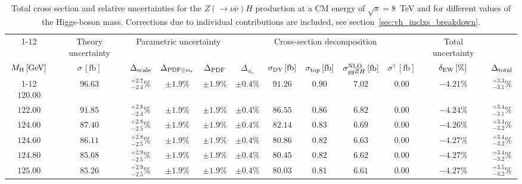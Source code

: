 \begin{landscape}
\begin{table}[ht!]
\caption{Total cross section and relative uncertainties for the $Z ( \rightarrow 
\nu \bar{\nu}) H$ production at a CM energy of  $\sqrt{s}=8$~TeV and for different values of the Higgs-boson mass. Corrections due to individual contributions are included, see section~\ref{sec:vh_inclxs_breakdown}.}
\label{tab:zh_nu_xs_8tev}
\centering
\scriptsize
{\renewcommand{\arraystretch}{1.4}
\begin{tabular}{| cc | c | ccc | ccccc | c |}
\cline{1-12}
\multicolumn{2}{|c|}{\(\sqrt{s} = 8\,\mathrm{TeV}\)} &
\multicolumn{1}{|c|}{Theory uncertainty} &
\multicolumn{3}{|c|}{Parametric uncertainty} &
\multicolumn{5}{|c|}{Cross-section decomposition} &
\multicolumn{1}{c|}{Total uncertainty} \\
\(M_\mathrm{H}\,[\mathrm{GeV}]\) & \(\sigma\,[\mathrm{fb}]\) &
\(\Delta_{\rm scale}\) &
\(\Delta_{\rm PDF\oplus\alpha_s}\) &
{\color{black!55}\(\Delta_{\rm PDF}\)} & {\color{black!55}\(\Delta_{\alpha_s}\)} &
\(\sigma_{\rm DY}\,[\mathrm{fb}]\) & \(\sigma_{\rm top}\,[\mathrm{fb}]\) & \(\sigma^{\rm NLO}_{ggZH}\,[\mathrm{fb}]\) & \(\sigma^\gamma\,[\mathrm{fb}]\) & \(\delta_{\rm EW}\,[\%]\) &
\(\Delta_{\rm total}\)
\\
\cline{1-12}
$120.00$ & $96.63$ & $^{+2.7}_{-2.4}\%$ & $\pm 1.9\%$ & {\color{black!55}$\pm 1.9\%$} & {\color{black!55}$\pm 0.4\%$} & $91.26$ & $0.90$ & $7.02$ & $0.00$ & $-4.21\%$ & $^{+3.3}_{-3.1}\%$ \\
$122.00$ & $91.85$ & $^{+2.8}_{-2.4}\%$ & $\pm 1.9\%$ & {\color{black!55}$\pm 1.9\%$} & {\color{black!55}$\pm 0.4\%$} & $86.55$ & $0.86$ & $6.82$ & $0.00$ & $-4.24\%$ & $^{+3.4}_{-3.1}\%$ \\
$124.00$ & $87.40$ & $^{+2.8}_{-2.5}\%$ & $\pm 1.9\%$ & {\color{black!55}$\pm 1.9\%$} & {\color{black!55}$\pm 0.4\%$} & $82.14$ & $0.83$ & $6.69$ & $0.00$ & $-4.26\%$ & $^{+3.4}_{-3.2}\%$ \\
$124.60$ & $86.11$ & $^{+2.8}_{-2.5}\%$ & $\pm 1.9\%$ & {\color{black!55}$\pm 1.9\%$} & {\color{black!55}$\pm 0.4\%$} & $80.86$ & $0.82$ & $6.63$ & $0.00$ & $-4.27\%$ & $^{+3.4}_{-3.2}\%$ \\
$124.80$ & $85.68$ & $^{+2.9}_{-2.5}\%$ & $\pm 1.9\%$ & {\color{black!55}$\pm 1.9\%$} & {\color{black!55}$\pm 0.4\%$} & $80.45$ & $0.82$ & $6.62$ & $0.00$ & $-4.27\%$ & $^{+3.4}_{-3.2}\%$ \\
$125.00$ & $85.26$ & $^{+2.9}_{-2.5}\%$ & $\pm 1.9\%$ & {\color{black!55}$\pm 1.9\%$} & {\color{black!55}$\pm 0.4\%$} & $80.03$ & $0.81$ & $6.61$ & $0.00$ & $-4.27\%$ & $^{+3.5}_{-3.2}\%$ \\

\end{tabular}}
\end{table}
\end{landscape}
